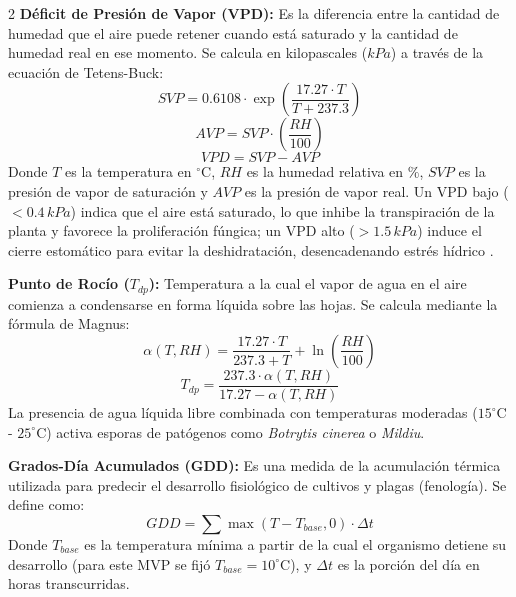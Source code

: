 \documentclass[a4paper, 11pt]{article}
\begin{document}
\begin{multicols}{2}
\textbf{Déficit de Presión de Vapor (VPD):} Es la diferencia entre la cantidad de humedad que el aire puede retener cuando está saturado y la cantidad de humedad real en ese momento. Se calcula en kilopascales ($kPa$) a través de la ecuación de Tetens-Buck:
\begin{equation}
    SVP = 0.6108 \cdot \exp\left(\frac{17.27 \cdot T}{T + 237.3}\right)
\end{equation}
\begin{equation}
    AVP = SVP \cdot \left(\frac{RH}{100}\right)
\end{equation}
\begin{equation}
    VPD = SVP - AVP
\end{equation}
Donde $T$ es la temperatura en $^\circ\text{C}$, $RH$ es la humedad relativa en $\%$, $SVP$ es la presión de vapor de saturación y $AVP$ es la presión de vapor real. Un VPD bajo ($<0.4\,kPa$) indica que el aire está saturado, lo que inhibe la transpiración de la planta y favorece la proliferación fúngica; un VPD alto ($>1.5\,kPa$) induce el cierre estomático para evitar la deshidratación, desencadenando estrés hídrico \cite{ref4}.

\textbf{Punto de Rocío ($T_{dp}$):} Temperatura a la cual el vapor de agua en el aire comienza a condensarse en forma líquida sobre las hojas. Se calcula mediante la fórmula de Magnus:
\begin{equation}
    \alpha(T, RH) = \frac{17.27 \cdot T}{237.3 + T} + \ln\left(\frac{RH}{100}\right)
\end{equation}
\begin{equation}
    T_{dp} = \frac{237.3 \cdot \alpha(T, RH)}{17.27 - \alpha(T, RH)}
\end{equation}
La presencia de agua líquida libre combinada con temperaturas moderadas ($15^\circ\text{C}$ - $25^\circ\text{C}$) activa esporas de patógenos como \textit{Botrytis cinerea} o \textit{Mildiu}.

\textbf{Grados-Día Acumulados (GDD):} Es una medida de la acumulación térmica utilizada para predecir el desarrollo fisiológico de cultivos y plagas (fenología). Se define como:
\begin{equation}
    GDD = \sum \max(T - T_{base}, 0) \cdot \Delta t
\end{equation}
Donde $T_{base}$ es la temperatura mínima a partir de la cual el organismo detiene su desarrollo (para este MVP se fijó $T_{base} = 10^\circ\text{C}$), y $\Delta t$ es la porción del día en horas transcurridas.


\end{multicols}
\end{document}
